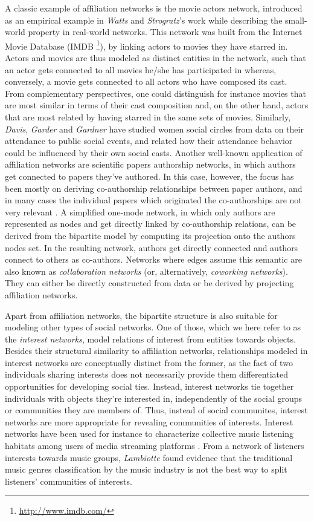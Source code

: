 A classic example of affiliation networks is the movie actors network, introduced as an empirical example in \textit{Watts} and \textit{Strogratz}'s work \cite{Watts1998} while describing the small-world property in real-world networks.
This network was built from the Internet Movie Database (IMDB \footnote{\url{http://www.imdb.com/}}), by linking actors to movies they have starred in.
Actors and movies are thus modeled as distinct entities in the network, such that an actor gets connected to all movies he/she has participated in whereas, conversely, a movie gets connected to all actors who have composed its cast.  
From complementary perspectives, one could distinguish for instance movies that are most similar in terms of their cast composition and, on the other hand, actors that are most related by having starred in the same sets of movies.
%
Similarly, \textit{Davis}, \textit{Garder} and \textit{Gardner} have studied women social circles from data on their attendance to public social events, and related how their attendance behavior could be influenced by their own social casts. 
%
Another well-known application of affiliation networks are scientific papers authorship networks, in which authors get connected to papers they've authored.
In this case, however, the focus has been mostly on deriving co-authorship relationships between paper authors, and in many cases the individual papers which originated the co-authorships are not very relevant \cite{Newman2004, Borett2014}.
A simplified one-mode network, in which only authors are represented as nodes and get directly linked by co-authorship relations, can be derived from the bipartite model by computing its projection onto the authors nodes set.
In the resulting network, authors get directly connected and authors connect to others as co-authors.
Networks where edges assume this semantic are also known as \textit{collaboration networks} (or, alternatively, \textit{coworking networks}). 
They can either be directly constructed from data or be derived by projecting affiliation networks.

Apart from affiliation networks, the bipartite structure is also suitable for modeling other types of social networks.
One of those, which we here refer to as the \textit{interest networks}, model relations of interest from entities towards objects.
Besides their structural similarity to affiliation networks, relationships modeled in interest networks are conceptually distinct from the former, as the fact of two individuals sharing interests does not necessarily provide them differentiated opportunities for developing social ties.
Instead, interest networks tie together individuals with objects they're interested in, independently of the social groups or communities they are members of. 
Thus, instead of social communites, interest networks are more appropriate for revealing communities of interests.
%
Interest networks have been used for instance to characterize collective music listening habitats among users of media streaming platforms \cite{Lambiotte}.
From a network of listeners interests towards music groups, \textit{Lambiotte} found evidence that the traditional music genres classification by the music industry is not the best way to split listeners' communities of interests.




